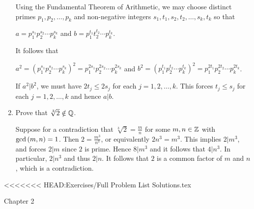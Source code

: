 \documentclass[11pt,fleqn,dvipsnames,usenames]{article}
\newcommand{\p}{\noindent}
\begin{document}
\begin{enumerate}
\solution Using the Fundamental Theorem of Arithmetic, we may choose distinct primes $p_{1},p_{2},\ldots, p_{k}$ and non-negative integers $s_{1},t_{1},s_{2},t_{2},\ldots,s_{k},t_{k}$ so that
\begin{center}
$a = p_{1}^{s_{1}}p_{2}^{s_{2}}\cdots p_{k}^{s_{k}}$ and $b = p_{1}^{t_{1}}t_{2}^{t_{2}}\cdots p_{k}^{t_{k}}$.
\end{center}
\p It follows that
\begin{center}
$a^2 = \left(p_{1}^{s_{1}}p_{2}^{s_{2}}\cdots p_{k}^{s_{k}}\right)^2 = p_{1}^{2s_{1}}p_{2}^{2s_{2}}\cdots p_{k}^{2s_{k}}$ and $b^2 = \left(p_{1}^{t_{1}}p_{2}^{t_{2}}\cdots p_{k}^{t_{k}}\right)^2 = p_{1}^{2t_{1}}p_{2}^{2t_{2}}\cdots p_{k}^{2t_{k}}$.
\end{center}
\p If $a^2|b^2$, we must have $2t_{j}\leq 2s_{j}$ for each $j=1,2,\ldots, k$.  This forces $t_{j}\leq s_{j}$ for each $j=1,2,\ldots, k$ and hence $a|b$.

\item Prove that $\sqrt[3]{2}\notin\mathbb{Q}$.
\vsmsp

\solution Suppose for a contradiction that $\sqrt[3]{2} = \frac{m}{n}$ for some $m,n\in\mathbb{Z}$ with $\text{gcd}\left(m,n\right)=1$.  Then $2 = \frac{m^3}{n^3}$, or equivalently $2n^3 = m^3$.  This implies $2|m^3$, and forces $2|m$ since $2$ is prime.  Hence $8|m^3$ and it follows that $4|n^3$.  In particular, $2|n^3$ and thus $2|n$.  It follows that $2$ is a common factor of $m$ and $n$, which is a contradiction.

\end{enumerate}
<<<<<<< HEAD:Exercises/Full Problem List Solutions.tex
\vsp

{\huge Chapter 2}
\vsp
\end{document}
